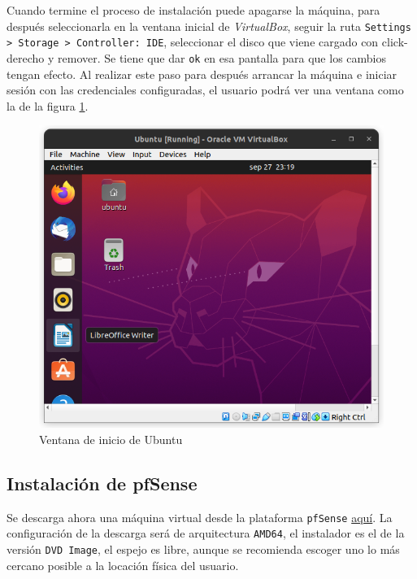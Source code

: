 \documentclass{article}
\begin{document}
            Cuando termine el proceso de instalación puede apagarse la máquina, para después seleccionarla en la ventana inicial de \emph{VirtualBox}, seguir la ruta \texttt{Settings > Storage > Controller: IDE}, seleccionar el disco que viene cargado con click-derecho y remover. Se tiene que dar \texttt{ok} en esa pantalla para que los cambios tengan efecto. Al realizar este paso para después arrancar la máquina e iniciar sesión con las credenciales configuradas, el usuario podrá ver una ventana como la de la figura \ref{fig:ubuntu-init}.
            \begin{figure}[!htbp]
                \centering
                \includegraphics[scale=0.4]{img/ubuntu-init.png}
                \caption{Ventana de inicio de Ubuntu}
                \label{fig:ubuntu-init}
            \end{figure}

        \subsection{Instalación de pfSense}
            
            Se descarga ahora una máquina virtual desde la plataforma \texttt{pfSense} \href{https://www.pfsense.org/download/#}{aquí}. La configuración de la descarga será de arquitectura \texttt{AMD64}, el instalador es el de la versión \texttt{DVD Image}, el espejo es libre, aunque se recomienda escoger uno lo más cercano posible a la locación física del usuario.
\end{document}
